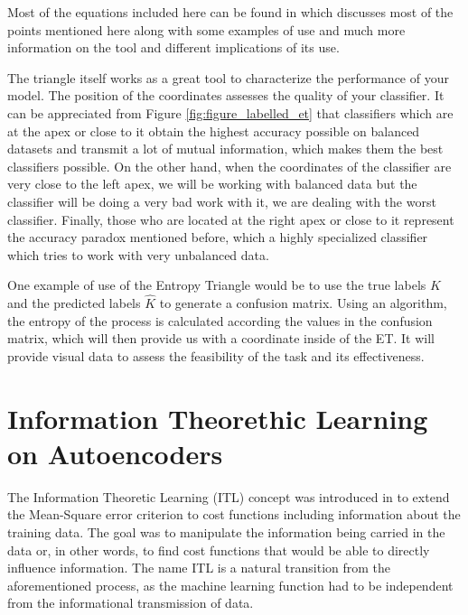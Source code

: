 Most of the equations included here can be found in \cite{val:pel:18c} which discusses most of the points mentioned here along with some examples of use and much more information on the tool and different implications of its use. \par

The triangle itself works as a great tool to characterize the performance of your model. The position of the coordinates assesses the quality of your classifier. It can be appreciated from Figure \ref{fig:figure_labelled_et} that classifiers which are at the apex or close to it obtain the highest accuracy possible on balanced datasets and transmit a lot of mutual information, which makes them the best classifiers possible. On the other hand, when the coordinates of the classifier are very close to the left apex, we will be working with balanced data but the classifier will be doing a very bad work with it, we are dealing with the worst classifier. Finally, those who are located at the right apex or close to it represent the accuracy paradox mentioned before, which a highly specialized classifier which tries to work with very unbalanced data.\par

One example of use of the Entropy Triangle would be to use the true labels $K$ and the predicted labels $\hat{K}$ to generate a confusion matrix. Using an algorithm, the entropy of the process is calculated according the values in the confusion matrix, which will then provide us with a coordinate inside of the ET. It will provide visual data to assess the feasibility of the task and its effectiveness.\par


\section{Information Theorethic Learning on Autoencoders}

The Information Theoretic Learning (ITL) concept was introduced in \cite{Principe_2000} to extend the Mean-Square error criterion to cost functions including information about the training data. The goal was to manipulate the information being carried in the data or, in other words, to find cost functions that would be able to directly influence information. The name ITL is a natural transition from the aforementioned process, as the machine learning function had to be independent from the informational transmission of data. 


